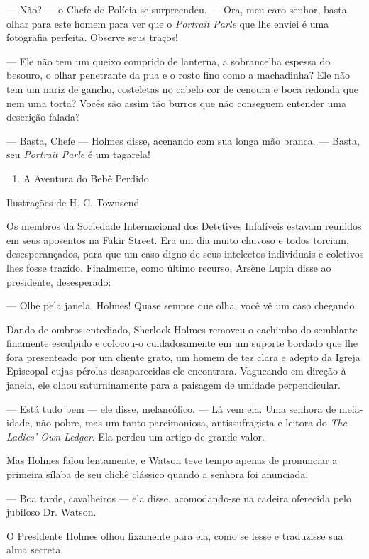 --- Não? --- o Chefe de Polícia se surpreendeu. --- Ora, meu caro
senhor, basta olhar para este homem para ver que o \emph{Portrait Parle}
que lhe enviei é uma fotografia perfeita. Observe seus traços!

--- Ele não tem um queixo comprido de lanterna, a sobrancelha espessa do
besouro, o olhar penetrante da pua e o rosto fino como a machadinha? Ele
não tem um nariz de gancho, costeletas no cabelo cor de cenoura e boca
redonda que nem uma torta? Vocês são assim tão burros que não conseguem
entender uma descrição falada?

--- Basta, Chefe --- Holmes disse, acenando com sua longa mão branca.
--- Basta, seu \emph{Portrait Parle} é um tagarela!

\begin{enumerate}
\item
  A Aventura do Bebê Perdido
\end{enumerate}

Ilustrações de H. C. Townsend

Os membros da Sociedade Internacional dos Detetives Infalíveis estavam
reunidos em seus aposentos na Fakir Street. Era um dia muito chuvoso e
todos torciam, desesperançados, para que um caso digno de seus
intelectos individuais e coletivos lhes fosse trazido. Finalmente, como
último recurso, Arsène Lupin disse ao presidente, desesperado:

--- Olhe pela janela, Holmes! Quase sempre que olha, você vê um caso
chegando.

Dando de ombros entediado, Sherlock Holmes removeu o cachimbo do
semblante finamente esculpido e colocou-o cuidadosamente em um suporte
bordado que lhe fora presenteado por um cliente grato, um homem de tez
clara e adepto da Igreja Episcopal cujas pérolas desaparecidas ele
encontrara. Vagueando em direção à janela, ele olhou saturninamente para
a paisagem de umidade perpendicular.

--- Está tudo bem --- ele disse, melancólico. --- Lá vem ela. Uma
senhora de meia-idade, não pobre, mas um tanto parcimoniosa,
antissufragista e leitora do \emph{The Ladies' Own Ledger}. Ela perdeu
um artigo de grande valor.

Mas Holmes falou lentamente, e Watson teve tempo apenas de pronunciar a
primeira sílaba de seu clichê clássico quando a senhora foi anunciada.

--- Boa tarde, cavalheiros --- ela disse, acomodando-se na cadeira
oferecida pelo jubiloso Dr. Watson.

O Presidente Holmes olhou fixamente para ela, como se lesse e traduzisse
sua alma secreta.

